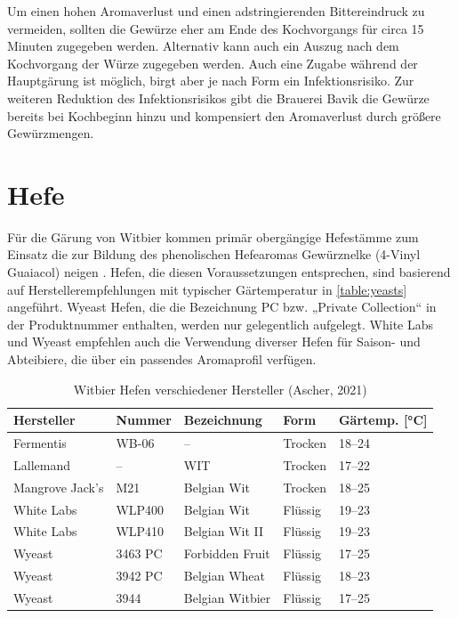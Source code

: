 \documentclass[a4paper,parskip=half]{scrartcl}
\begin{document}
Um einen hohen Aromaverlust und einen adstringierenden Bittereindruck zu vermeiden,
sollten die Gewürze eher am Ende des Kochvorgangs für circa 15 Minuten
zugegeben werden. Alternativ kann auch ein Auszug nach dem Kochvorgang der
Würze zugegeben werden. Auch eine Zugabe während der Hauptgärung ist möglich,
birgt aber je nach Form ein Infektionsrisiko.
Zur weiteren Reduktion des Infektionsrisikos gibt die Brauerei
Bavik die Gewürze bereits bei Kochbeginn hinzu und kompensiert den
Aromaverlust durch größere Gewürzmengen. \parencites[17\psq]{Strottner1999} [62]{Hieronymus2010}

\section*{Hefe}

Für die Gärung von Witbier kommen primär obergängige Hefestämme
zum Einsatz die zur Bildung des phenolischen Hefearomas
Gewürznelke (4-Vinyl Guaiacol) neigen \parencite[46]{Roncoroni2018}.
Hefen, die diesen Voraussetzungen entsprechen, sind
basierend auf Herstellerempfehlungen mit typischer Gärtemperatur
in \autoref{table:yeasts} angeführt. Wyeast Hefen, die die
Bezeichnung PC bzw. „Private Collection“ in der Produktnummer enthalten,
werden nur gelegentlich aufgelegt. White Labs und Wyeast empfehlen
auch die Verwendung diverser Hefen für Saison- und Abteibiere,
die über ein passendes Aromaprofil verfügen.

\begin{table}[H]
\centering
\begin{tabular}{lllll}
\toprule
Hersteller      & Nummer  & Bezeichnung          & Form    & Gärtemp. [°C] \\
\midrule
Fermentis       & WB-06   & –                    & Trocken & 18–24        \\
Lallemand       & –       & WIT                  & Trocken & 17–22        \\
Mangrove Jack's & M21     & Belgian Wit          & Trocken & 18–25        \\
White Labs      & WLP400  & Belgian Wit          & Flüssig & 19–23        \\
White Labs      & WLP410  & Belgian Wit II       & Flüssig & 19–23        \\
Wyeast          & 3463 PC & Forbidden Fruit      & Flüssig & 17–25        \\
Wyeast          & 3942 PC & Belgian Wheat        & Flüssig & 18–23        \\
Wyeast          & 3944    & Belgian Witbier      & Flüssig & 17–25        \\
\bottomrule
\end{tabular}
\caption{Witbier Hefen verschiedener Hersteller (Ascher, 2021)}
\label{table:yeasts}
\end{table}
\end{document}
